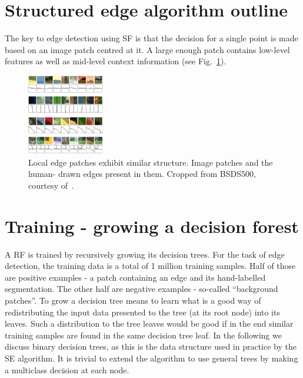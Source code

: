 \section{Structured edge algorithm outline}
The key to edge detection using SF is that the decision for a single point is made based on an image patch centred at it. A large enough patch contains low-level features as well as mid-level context information (see Fig.~\ref{fig:srf-structure-in-edge-patches}).

\begin{figure}[ht!]
\centering
 \includegraphics[width=0.3\textwidth]{images/srf/structure-in-edge-patches.png}
\caption{Local edge patches exhibit similar structure. Image patches and the human-%
drawn edges present in them. Cropped from BSDS500, courtesy of~\cite{DollarICCV13PresentationSlides}.}
\label{fig:srf-structure-in-edge-patches}
\end{figure}

\section{Training - growing a decision forest}
A RF is trained by recursively growing its decision trees. For the task of edge detection, the training data is a total of 1 million training samples. Half of those are positive examples - a patch containing an edge and its hand-labelled segmentation. The other half are negative examples - so-called ``background patches''. To grow a decision tree means to learn what is a good way of redistributing the input data presented to the tree (at its root node) into its leaves. Such a distribution to the tree leaves would be good if in the end similar training samples are found in the same decision tree leaf. In the following we discuss binary decision trees, as this is the data structure used in practice by the SE algorithm. It is trivial to extend the algorithm to use general trees by making a multiclass decision at each node. 

